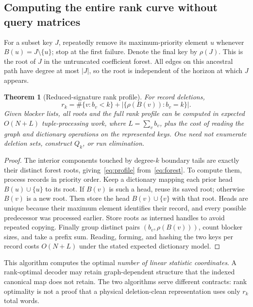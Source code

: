 \documentclass[11pt,a4paper]{article}
\newtheorem{theorem}{Theorem}[section]
\theoremstyle{definition}\newtheorem{definition}[theorem]{Definition}
\newcommand{\minus}{\setminus}
\begin{document}
\subsection{Computing the entire rank curve without query matrices}
For a subset key $J$, repeatedly remove its maximum-priority element $u$ whenever $B(u)=J\minus\{u\}$; stop at the first failure. Denote the final key by $\rho(J)$. This is the root of $J$ in the untruncated coefficient forest. All edges on this ancestral path have degree at most $|J|$, so the root is independent of the horizon at which $J$ appears.

\begin{theorem}[Reduced-signature rank profile]\label{thm:profile}
For record deletions,
\begin{equation}\label{eq:profile}
 r_k=\#\{v:b_v<k\}+
       \left|\{\rho(B(v)):b_v=k\}\right|.
\end{equation}
Given blocker lists, all roots and the full rank profile can be computed in expected $O(N+L)$ tuple-processing work, where $L=\sum_v b_v$, plus the cost of reading the graph and dictionary operations on the represented keys. One need not enumerate deletion sets, construct $Q_k$, or run elimination.
\end{theorem}
\begin{proof}
The interior components touched by degree-$k$ boundary tails are exactly their distinct forest roots, giving~\eqref{eq:profile} from~\eqref{eq:forest}. To compute them, process records in priority order. Keep a dictionary mapping each prior head $B(u)\cup\{u\}$ to its root. If $B(v)$ is such a head, reuse its saved root; otherwise $B(v)$ is a new root. Then store the head $B(v)\cup\{v\}$ with that root. Heads are unique because their maximum element identifies their record, and every possible predecessor was processed earlier. Store roots as interned handles to avoid repeated copying. Finally group distinct pairs $(b_v,\rho(B(v)))$, count blocker sizes, and take a prefix sum. Reading, forming, and hashing the two keys per record costs $O(N+L)$ under the stated expected dictionary model.
\end{proof}
This algorithm computes the optimal \emph{number of linear statistic coordinates}. A rank-optimal decoder may retain graph-dependent structure that the indexed canonical map does not retain. The two algorithms serve different contracts: rank optimality is not a proof that a physical deletion-clean representation uses only $r_k$ total words.
\end{document}
